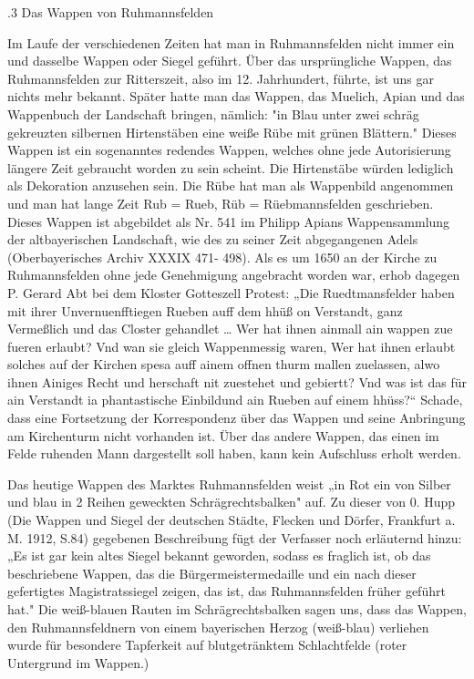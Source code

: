 \documentclass{book}
\begin{document}
.3 Das Wappen von Ruhmannsfelden

Im Laufe der verschiedenen Zeiten hat man in Ruhmannsfelden nicht immer ein und
dasselbe Wappen oder Siegel geführt. Über das ursprüngliche Wappen, das
Ruhmannsfelden zur Ritterszeit, also im 12. Jahrhundert, führte, ist uns gar
nichts mehr bekannt. Später hatte man das Wappen, das Muelich, Apian und das
Wappenbuch der Landschaft bringen, nämlich: "in Blau unter zwei schräg
gekreuzten silbernen Hirtenstäben eine weiße Rübe mit grünen Blättern." Dieses
Wappen ist ein sogenanntes redendes Wappen, welches ohne jede Autorisierung
längere Zeit gebraucht worden zu sein scheint. Die Hirtenstäbe würden lediglich
als Dekoration anzusehen sein. Die Rübe hat man als Wappenbild angenommen und
man hat lange Zeit Rub = Rueb, Rüb = Rüebmannsfelden geschrieben. Dieses Wappen
ist abgebildet als Nr. 541 im Philipp Apians Wappensammlung der altbayerischen
Landschaft, wie des zu seiner Zeit abgegangenen Adels (Oberbayerisches Archiv
XXXIX 471- 498). Als es um 1650 an der Kirche zu Ruhmannsfelden ohne jede
Genehmigung angebracht worden war, erhob dagegen P. Gerard Abt bei dem Kloster
Gotteszell Protest: „Die Ruedtmansfelder haben mit ihrer Unvernuenfftiegen
Rueben auff dem hhüß on Verstandt, ganz Vermeßlich und das Closter gehandlet …
Wer hat ihnen ainmall ain wappen zue fueren erlaubt? Vnd wan sie gleich
Wappenmessig waren, Wer hat ihnen erlaubt solches auf der Kirchen spesa auff
ainem offnen thurm mallen zuelassen, alwo ihnen Ainiges Recht und herschaft nit
zuestehet und gebiertt? Vnd was ist das für ain Verstandt ia phantastische
Einbildund ain Rueben auf einem hhüss?“ Schade, dass eine Fortsetzung der
Korrespondenz über das Wappen und seine Anbringung am Kirchenturm nicht
vorhanden ist. Über das andere Wappen, das einen im Felde ruhenden Mann
dargestellt soll haben, kann kein Aufschluss erholt werden.

Das heutige Wappen des Marktes Ruhmannsfelden weist „in Rot ein von Silber und
blau in 2 Reihen geweckten Schrägrechtsbalken" auf. Zu dieser von 0. Hupp (Die
Wappen und Siegel der deutschen Städte, Flecken und Dörfer, Frankfurt a. M.
1912, S.84) gegebenen Beschreibung fügt der Verfasser noch erläuternd hinzu: „Es
ist gar kein altes Siegel bekannt geworden, sodass es fraglich ist, ob das
beschriebene Wappen, das die Bürgermeistermedaille und ein nach dieser
gefertigtes Magistratssiegel zeigen, das ist, das Ruhmannsfelden früher geführt
hat." Die weiß-blauen Rauten im Schrägrechtsbalken sagen uns, dass das Wappen,
den Ruhmannsfeldnern von einem bayerischen Herzog (weiß-blau) verliehen wurde
für besondere Tapferkeit auf blutgetränktem Schlachtfelde (roter Untergrund im
Wappen.)
\end{document}
